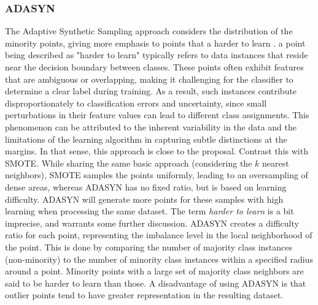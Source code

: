 \documentclass[letterpaper, notitlepage]{report}
\begin{document}
\subsubsection{ADASYN}
\label{section:adasyn}
The Adaptive Synthetic Sampling approach considers the distribution of the minority points, giving more emphasis to points that a harder to learn \parencite{He2008-xr}. a point being described as "harder to learn" typically refers to data instances that reside near the decision boundary between classes. These points often exhibit features that are ambiguous or overlapping, making it challenging for the classifier to determine a clear label during training. As a result, such instances contribute disproportionately to classification errors and uncertainty, since small perturbations in their feature values can lead to different class assignments. This phenomenon can be attributed to the inherent variability in the data and the limitations of the learning algorithm in capturing subtle distinctions at the margins. In that sense, this approach is close to the  proposal. Contrast this with SMOTE. While sharing the same basic approach (considering the $k$ nearest neighbors), SMOTE samples the points uniformly, leading to an oversampling of dense areas, whereas ADASYN has no fixed ratio, but is based on learning difficulty. ADASYN will generate more points for these samples with high learning when processing the same dataset. The term \textit{harder to learn} is a bit imprecise, and warrants some further discussion. ADASYN creates a difficulty ratio for each point, representing the imbalance level in the local neighborhood of the point. This is done by comparing the number of majority class instances (non-minority) to the number of minority class instances within a specified radius around a point. Minority points with a large set of majority class neighbors are said to be harder to learn than those. A disadvantage of using ADASYN is that outlier points tend to have greater representation in the resulting dataset.
\end{document}
